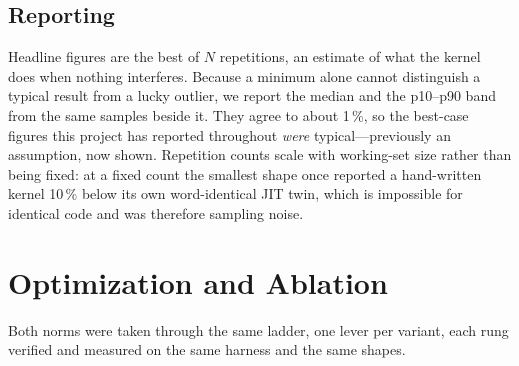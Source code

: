 \documentclass[conference,10pt]{IEEEtran}
\begin{document}
\subsection{Reporting}

Headline figures are the best of $N$ repetitions, an estimate of what the kernel
does when nothing interferes. Because a minimum alone cannot distinguish a
typical result from a lucky outlier, we report the median and the p10--p90 band
from the same samples beside it. They agree to about 1\,\%, so the best-case
figures this project has reported throughout \emph{were} typical---previously an
assumption, now shown. Repetition counts scale with working-set size rather than
being fixed: at a fixed count the smallest shape once reported a hand-written
kernel 10\,\% below its own word-identical JIT twin, which is impossible for
identical code and was therefore sampling noise.

\section{Optimization and Ablation}
\label{sec:ablation}

Both norms were taken through the same ladder, one lever per variant, each rung
verified and measured on the same harness and the same shapes.
\end{document}
